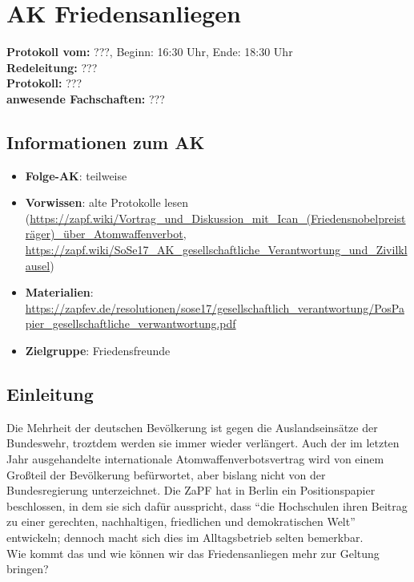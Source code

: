 
\section{AK Friedensanliegen}

	\textbf{Protokoll vom:} ???,
	Beginn: 16:30 Uhr,
	Ende: 18:30 Uhr \\
	\textbf{Redeleitung:} ??? \\
	\textbf{Protokoll:} ??? \\
	\textbf{anwesende Fachschaften:} ???

	\subsection*{Informationen zum AK}
		\begin{itemize}
			\item \textbf{Folge-AK}: teilweise
			\item \textbf{Vorwissen}: alte Protokolle lesen (\url{https://zapf.wiki/Vortrag_und_Diskussion_mit_Ican_(Friedensnobelpreisträger)_über_Atomwaffenverbot}, \url{https://zapf.wiki/SoSe17_AK_gesellschaftliche_Verantwortung_und_Zivilklausel})
      \item \textbf{Materialien}: \url{https://zapfev.de/resolutionen/sose17/gesellschaftlich_verantwortung/PosPapier_gesellschaftliche_verwantwortung.pdf}
			\item \textbf{Zielgruppe}: Friedensfreunde
		\end{itemize}

  \subsection{Einleitung}
    Die Mehrheit der deutschen Bevölkerung ist gegen die Auslandseinsätze der Bundeswehr, troztdem werden sie immer wieder verlängert. Auch der im letzten Jahr ausgehandelte internationale Atomwaffenverbotsvertrag wird von einem Großteil der Bevölkerung befürwortet, aber bislang nicht von der Bundesregierung unterzeichnet. Die ZaPF hat in Berlin ein Positionspapier beschlossen, in dem sie sich dafür ausspricht, dass ``die Hochschulen ihren Beitrag zu einer gerechten, nachhaltigen, friedlichen und demokratischen Welt'' entwickeln; dennoch macht sich dies im Alltagsbetrieb selten bemerkbar. \\

    Wie kommt das und wie können wir das Friedensanliegen mehr zur Geltung bringen?

